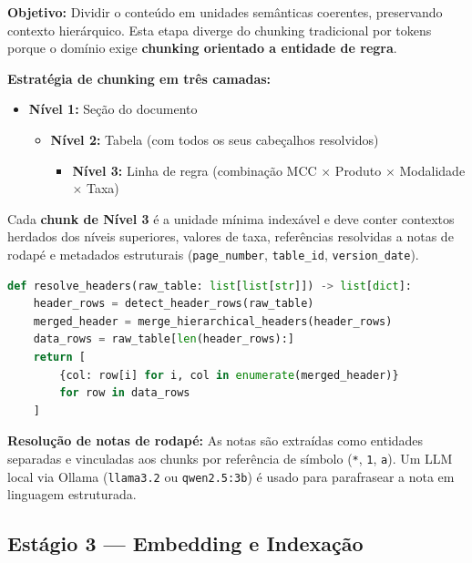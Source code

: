 \documentclass[12pt,a4paper]{article}
\begin{document}
\textbf{Objetivo:} Dividir o conteúdo em unidades semânticas coerentes, preservando contexto hierárquico. Esta etapa diverge do chunking tradicional por tokens porque o domínio exige \textbf{chunking orientado a entidade de regra}.

\begin{center}
\small
\begin{minipage}{0.85\textwidth}
\textbf{Estratégia de chunking em três camadas:}
\begin{itemize}[label=$\rightarrow$]
    \item \textbf{Nível 1:} Seção do documento
    \begin{itemize}[label=$\rightarrow$]
        \item \textbf{Nível 2:} Tabela (com todos os seus cabeçalhos resolvidos)
        \begin{itemize}[label=$\rightarrow$]
            \item \textbf{Nível 3:} Linha de regra (combinação MCC $\times$ Produto $\times$ Modalidade $\times$ Taxa)
        \end{itemize}
    \end{itemize}
\end{itemize}
\end{minipage}
\end{center}

Cada \textbf{chunk de Nível 3} é a unidade mínima indexável e deve conter contextos herdados dos níveis superiores, valores de taxa, referências resolvidas a notas de rodapé e metadados estruturais (\texttt{page_number}, \texttt{table_id}, \texttt{version_date}).

\begin{lstlisting}[language=Python, caption=Pseudocódigo de resolução de multi-header]
def resolve_headers(raw_table: list[list[str]]) -> list[dict]:
    header_rows = detect_header_rows(raw_table)  
    merged_header = merge_hierarchical_headers(header_rows)
    data_rows = raw_table[len(header_rows):]
    return [
        {col: row[i] for i, col in enumerate(merged_header)}
        for row in data_rows
    ]
\end{lstlisting}

\textbf{Resolução de notas de rodapé:} As notas são extraídas como entidades separadas e vinculadas aos chunks por referência de símbolo (\texttt{*}, \texttt{1}, \texttt{a}). Um LLM local via Ollama (\texttt{llama3.2} ou \texttt{qwen2.5:3b}) é usado para parafrasear a nota em linguagem estruturada.

\subsection{Estágio 3 --- Embedding e Indexação}
\end{document}
